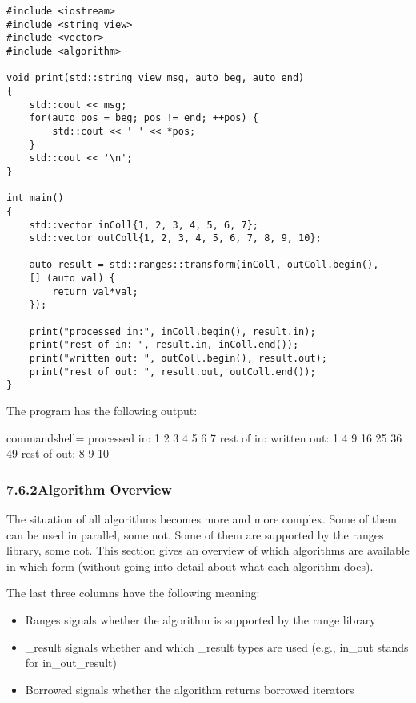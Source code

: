 \begin{lstlisting}[style=styleCXX]
#include <iostream>
#include <string_view>
#include <vector>
#include <algorithm>

void print(std::string_view msg, auto beg, auto end)
{
	std::cout << msg;
	for(auto pos = beg; pos != end; ++pos) {
		std::cout << ' ' << *pos;
	}
	std::cout << '\n';
}

int main()
{
	std::vector inColl{1, 2, 3, 4, 5, 6, 7};
	std::vector outColl{1, 2, 3, 4, 5, 6, 7, 8, 9, 10};
	
	auto result = std::ranges::transform(inColl, outColl.begin(),
	[] (auto val) {
		return val*val;
	});
	
	print("processed in:", inColl.begin(), result.in);
	print("rest of in: ", result.in, inColl.end());
	print("written out: ", outColl.begin(), result.out);
	print("rest of out: ", result.out, outColl.end());
}
\end{lstlisting}

The program has the following output:

{\footnotesize
\begin{tcblisting}{commandshell={}}
processed in: 1 2 3 4 5 6 7
rest of in:
written out: 1 4 9 16 25 36 49
rest of out: 8 9 10
\end{tcblisting}
}

\subsubsection*{ 7.6.2\hspace{0.2cm}Algorithm Overview}

The situation of all algorithms becomes more and more complex. Some of them can be used in parallel, some not. Some of them are supported by the ranges library, some not. This section gives an overview of which algorithms are available in which form (without going into detail about what each algorithm does).

The last three columns have the following meaning:

\begin{itemize}
\item
Ranges signals whether the algorithm is supported by the range library

\item
\_result signals whether and which \_result types are used (e.g., in\_out stands for in\_out\_result)

\item
Borrowed signals whether the algorithm returns borrowed iterators
\end{itemize}

